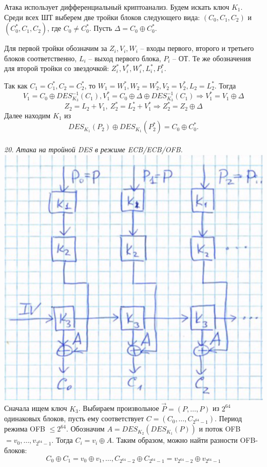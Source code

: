 Атака использует дифференциальный криптоанализ. Будем искать ключ $K_1$. Среди всех ШТ выберем две тройки блоков следующего вида: $(C_0, C_1, C_2)$ и $(C_0^*, C_1, C_2)$, где $C_0 \ne C_0^*$. Пусть $\Delta = C_0 \oplus C_0^*$.

Для первой тройки обозначим за $Z_i, V_i, W_i$ -- входы первого, второго и третьего блоков соответственно, $L_i$ -- выход первого блока, $P_i$ -- ОТ. Те же обозначения для второй тройки со звездочкой: $Z_i^*, V_i^*, W_i^*, L_i^*, P_i^*$.

Так как $C_1 = C_1^*, C_2 = C_2^*$, то $W_1 = W_1^*, W_2 = W_2^*, V_2 = V_2^*, L_2 = L_2^*$.
Тогда
$$V_1 = C_0 \oplus DES_{K_3}^{-1}(C_1), V_1^* = C_0 \oplus \Delta \oplus DES_{K_3}^{-1}(C_1) \Rightarrow V_1^* = V_1 \oplus \Delta$$
$$Z_2 = L_2 + V_1,\ Z_2^* = L_2^* + V_1^* \Rightarrow Z_2^* = Z_2 \oplus \Delta$$
Далее находим $K_1$ из
$$DES_{K_1}(P_2) \oplus DES_{K_1}(P_2^*) = C_0 \oplus C_0^*.$$ \\

\newpage
\noindent \textit{20. Атака на тройной DES в режиме ECB/ECB/OFB.} \\

\includegraphics[scale=.5]{eka/img/ECB_ECB_OFB.png} \\

Сначала ищем ключ $K_3$. Выбираем произвольное $\vec P = (P, \ldots, P)$ из $2^{64}$ одинаковых блоков, пусть ему соответствует $C = (C_0, \ldots, C_{2^{64}-1})$. Период режима OFB $\le 2^{64}$.
Обозначим $A = DES_{K_2}(DES_{K_1}(P))$ и поток OFB $= v_0,\ldots,v_{2^{64}-1}$. Тогда $C_i = v_i \oplus A$. Таким образом, можно найти разности OFB-блоков:
$$C_0 \oplus C_1 = v_0 \oplus v_1, \ldots, C_{2^{64}-2} \oplus C_{2^{64}-1} = v_{2^{64}-2} \oplus v_{2^{64}-1}$$

